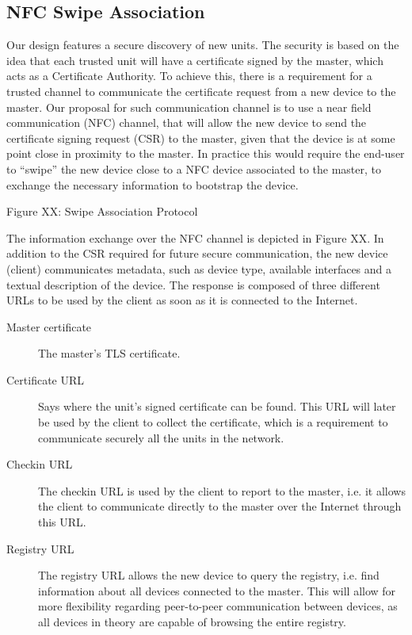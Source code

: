 \subsection{NFC Swipe Association}
Our design features a secure discovery of new units. The security is based on the idea that each trusted unit will have a certificate signed by the master, which acts as a Certificate Authority. To achieve this, there is a requirement for a trusted channel to communicate the certificate request from a new device to the master. Our proposal for such communication channel is to use a near field communication (NFC) channel, that will allow the new device to send the certificate signing request (CSR) to the master, given that the device is at some point close in proximity to the master. In practice this would require the end-user to “swipe” the new device close to a NFC device associated to the master, to exchange the necessary information to bootstrap the device.

Figure XX: Swipe Association Protocol

The information exchange over the NFC channel is depicted in Figure XX. In addition to the CSR required for future secure communication, the new device (client) communicates metadata, such as device type, available interfaces and a textual description of the device. The response is composed of three different URLs to be used by the client as soon as it is connected to the Internet.

\begin{description}
\item[Master certificate]
    The master's TLS certificate.
\item[Certificate URL]
    Says where the unit's signed certificate can be found. This URL will later be used by the client to collect the certificate, which is a requirement to communicate securely all the units in the network.
\item[Checkin URL]
    The checkin URL is used by the client to report to the master, i.e. it allows the client to communicate directly to the master over the Internet through this URL.
\item[Registry URL]
    The registry URL allows the new device to query the registry, i.e. find information about all devices connected to the master. This will allow for more flexibility regarding peer-to-peer communication between devices, as all devices in theory are capable of browsing the entire registry.
\end{description}

